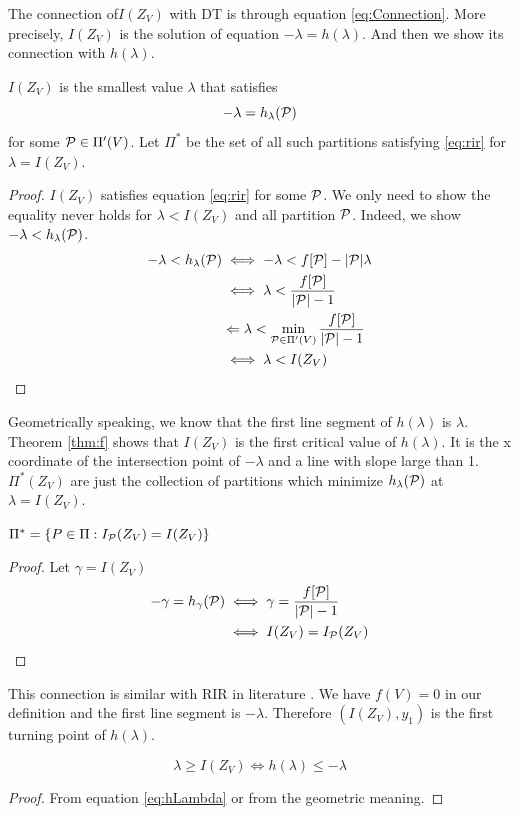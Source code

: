 \documentclass{article}
\begin{document}
The connection of$I(Z_V)$ with DT is through equation \eqref{eq:Connection}. More precisely, $I(Z_V)$
is the solution of equation $-\lambda = h(\lambda)$.
And then we show its connection with $h(\lambda)$.
\begin{theorem}\label{thm:f}
$I(Z_V)$ is the smallest value $\lambda$ that satisfies
\begin{equation}\label{eq:rir}
-\lambda = h_{\lambda}(\P)
\end{equation}
for some $\P \in \Pi'(V)$. Let $\Pi^*$ be the set of all such partitions satisfying \eqref{eq:rir}
for $\lambda = I(Z_V)$.
\end{theorem}
\begin{proof}
$I(Z_V)$ satisfies equation \eqref{eq:rir} for some $\P$. We only need to show the equality never holds for $\lambda < I(Z_V)$ and all partition $\P$. Indeed, we show $-\lambda < h_{\lambda}(\P)$.
\begin{align*}
-\lambda < h_{\lambda}(\P) &\iff -\lambda < f[\P] - \abs{\P} \lambda \\
& \iff \lambda < \frac{ f[\P] }{ \abs{\P} - 1 } \\
& \Leftarrow \lambda < \min_{\P \in \Pi'(V)} \frac{f[\P]}{  \abs{\P} - 1 } \\
& \iff \lambda < I(Z_V)
\end{align*}
\end{proof}
\begin{remark}
Geometrically speaking, we know that the first line segment of $h(\lambda)$ is $\lambda$. Theorem \ref{thm:f} shows that $I(Z_V)$ is the first critical value of $h(\lambda)$. It is the x coordinate of the intersection point of $-\lambda$ and a line with slope large than 1. $\Pi^*(Z_V) $ are just the collection of partitions which minimize $h_{\lambda}(\P)$ at $\lambda = I(Z_V)$.
\end{remark}

\begin{corollary}\label{cor:F}
$\Pi^*= \{ P \in \Pi: I_{\P}(Z_V) = I(Z_V)\}$
\end{corollary}
\begin{proof}
Let $\gamma = I(Z_V)$
\begin{align*}
-\gamma = h_{\gamma}(\P) & \iff  \gamma = { f[\P] \over \abs{\P} - 1 } \\
& \iff I(Z_V) = I_{\P}(Z_V)
\end{align*}
\end{proof}
This connection is similar with RIR in literature \cite{ic}. We have $f(V)=0$ in our definition and the first line segment is $-\lambda$. Therefore
$(I(Z_V),  y_1)$ is the first turning point of $h(\lambda)$.
\begin{corollary}\label{cor:large}
	\begin{equation}
	\lambda \geq I(Z_V) \iff h(\lambda) \leq -\lambda
	\end{equation}
\end{corollary}
\begin{proof}
	From equation \eqref{eq:hLambda} or from the geometric meaning.
\end{proof}
\end{document}
